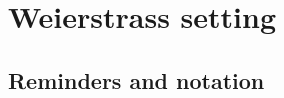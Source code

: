 \documentclass[preprint,12pt]{elsarticle}
\numberwithin{equation}{section} %
\newcommand{\alternatingtodo}[2][]{%
\iftoggle{lmargin}%
{%
\todo[#1]{#2}
\togglefalse{lmargin}
}{%
{%
\let\marginpar\marginnote%
\reversemarginpar%
\todo[#1]{#2}%
}%
\toggletrue{lmargin}%
}%
}%
\newcommand{\Matt}[1]{\alternatingtodo[author=\textbf{Matthew},size=\footnotesize,inline,color=green!30]{#1}}
\theoremstyle{theorem}
\theoremstyle{definition}
\newcommand{\C}{\mathbb{C}} %
\begin{document}






\section{Weierstrass setting}\label{sec:weierstrass}

\subsection{Reminders and notation}
\end{document}
